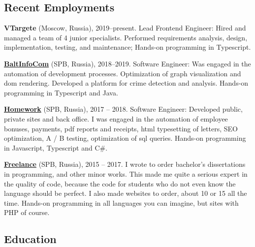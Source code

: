 \documentclass{yb}
\begin{document}
\subsection*{Recent Employments}

\textbf{VTargete} (Moscow, Russia), 2019--present.
Lead Frontend Engineer: 
Hired and managed a team of 4 junior specialists.
Performed requirements analysis, design, implementation, testing, and maintenance;
Hands-on programming in Typescript.

\textbf{\href{https://baltinfocom.ru/BigData\#en}{BaltInfoCom}} (SPB, Russia), 2018--2019.
Software Engineer:
Was engaged in the automation of development processes. Optimization of graph visualization and dom rendering. Developed a platform for crime detection and analysis.
Hands-on programming in Typescript and Java.

\textbf{\href{https://homework.ru}{Homework}} (SPB, Russia), 2017 -- 2018.
Software Engineer:
Developed public, private sites and back office. I was engaged in the automation of employee bonuses, payments, pdf reports and receipts, html typesetting of letters, SEO optimization, A / B testing, optimization of sql queries.
Hands-on programming in Javascript, Typescript and C\#.

\textbf{\href{https://www.upwork.com/}{Freelance}} (SPB, Russia), 2015 -- 2017.
I wrote to order bachelor's dissertations in programming, and other minor works. This made me quite a serious expert in the quality of code, because the code for students who do not even know the language should be perfect. I also made websites to order, about 10 or 15 all the time. 
Hands-on programming in all languages you can imagine, but sites with PHP of course.



\subsection*{Education}
\end{document}
